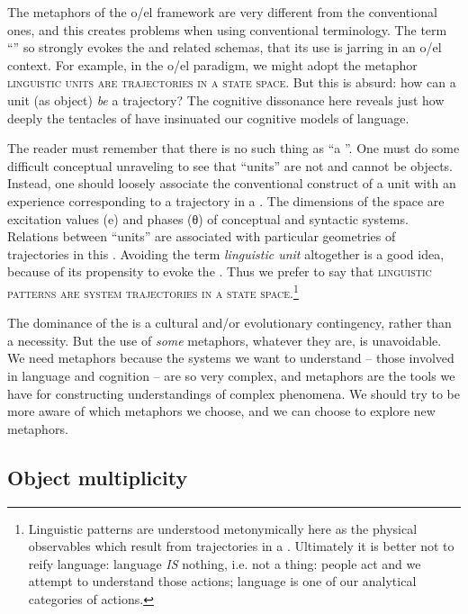   The metaphors of the o/el framework are very different from the conventional ones, and this creates problems when using conventional terminology. The term “” so strongly evokes the  and related schemas, that its use is jarring in an o/el context. For example, in the o/el paradigm, we might adopt the metaphor \textsc{linguistic units are trajectories in a state space}. But this is absurd: how can a unit (as object) \textit{be} a trajectory? The cognitive dissonance here reveals just how deeply the tentacles of  have insinuated our cognitive models of language.
  
  The reader must remember that there is no such thing as “a ”. One must do some difficult conceptual unraveling to see that “units” are not and cannot be objects. Instead, one should loosely associate the conventional construct of a unit with an experience corresponding to a trajectory in a . The dimensions of the space are excitation values (e) and phases (θ) of conceptual and syntactic systems. Relations between “units” are associated with particular geometries of trajectories in this . Avoiding the term \textit{linguistic unit} altogether is a good idea, because of its propensity to evoke the . Thus we prefer to say that \textsc{linguistic patterns are system trajectories in a state space}.\footnote{Linguistic patterns are understood metonymically here as the physical observables which result from trajectories in a . Ultimately it is better not to reify language: language \textit{IS} nothing, i.e. not a thing: people act and we attempt to understand those actions; language is one of our analytical categories of actions.}

  The dominance of the  is a cultural and/or evolutionary contingency, rather than a necessity. But the use of \textit{some} metaphors, whatever they are, is unavoidable. We need metaphors because the systems we want to understand -- those involved in language and cognition -- are so very complex, and metaphors are the tools we have for constructing understandings of complex phenomena. We should try to be more aware of which metaphors we choose, and we can choose to explore new metaphors.

\subsection{Object multiplicity}

